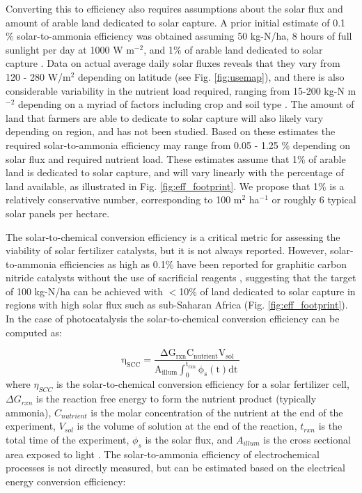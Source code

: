 Converting this to efficiency also requires assumptions about the solar flux and amount of arable land dedicated to solar capture. A prior initial estimate of 0.1 \% solar-to-ammonia efficiency was obtained assuming 50 kg-N/ha, 8 hours of full sunlight per day at 1000 W m$^{-2}$, and 1\% of arable land dedicated to solar capture \cite{Medford_2017}. Data on actual average daily solar fluxes reveals that they vary from 120 - 280 W/m$^2$ depending on latitude \cite{MacKay_2013} (see Fig. \ref{fig:usemap}), and there is also considerable variability in the nutrient load required, ranging from 15-200 kg-N m$^{-2}$ depending on a myriad of factors including crop and soil type \cite{FAOSTAT_2018}. The amount of land that farmers are able to dedicate to solar capture will also likely vary depending on region, and has not been studied. Based on these estimates the required solar-to-ammonia efficiency may range from 0.05 - 1.25 \% depending on solar flux and required nutrient load. These estimates assume that 1\% of arable land is dedicated to solar capture, and will vary linearly with the percentage of land available, as illustrated in Fig. \ref{fig:eff_footprint}. We propose that 1\% is a relatively conservative number, corresponding to 100 m$^2$ ha$^{-1}$ or roughly 6 typical solar panels per hectare.

The solar-to-chemical conversion efficiency is a critical metric for assessing the viability of solar fertilizer catalysts, but it is not always reported. However, solar-to-ammonia efficiencies as high as 0.1\% have been reported for graphitic carbon nitride catalysts without the use of sacrificial reagents \cite{Shiraishi_2018}, suggesting that the target of 100 kg-N/ha can be achieved with $<$10\% of land dedicated to solar capture in regions with high solar flux such as sub-Saharan Africa (Fig. \ref{fig:eff_footprint}). In the case of photocatalysis the solar-to-chemical conversion efficiency can be computed as:

\begin{equation}
\label{eq:chem_eff}
\mathrm{
\eta_{SCC} = \frac{\Delta G_{rxn}C_{nutrient}V_{sol}}{A_{illum} \int_{0}^{t_{rxn}}\phi_s(t) dt \: }
}
\end{equation}
where $\eta_{SCC}$ is the solar-to-chemical conversion efficiency for a solar fertilizer cell, $\Delta G_{rxn}$ is the reaction free energy to form the nutrient product (typically ammonia), $C_{nutrient}$ is the molar concentration of the nutrient at the end of the experiment, $V_{sol}$ is the volume of solution at the end of the reaction, $t_{rxn}$ is the total time of the experiment, $\phi_s$ is the solar flux, and $A_{illum}$ is the cross sectional area exposed to light \cite{Chen_2010}. The solar-to-ammonia efficiency of electrochemical processes is not directly measured, but can be estimated based on the electrical energy conversion efficiency:

